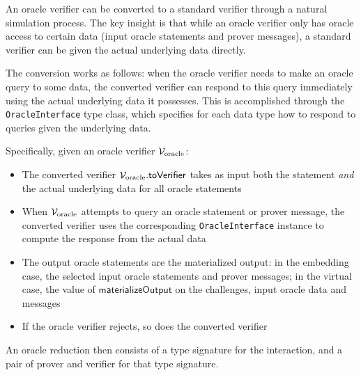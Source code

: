 \begin{definition}
    \label{def:oracle_verifier_to_verifier}
    An oracle verifier can be converted to a standard verifier through a natural simulation process. The key insight is that while an oracle verifier only has oracle access to certain data (input oracle statements and prover messages), a standard verifier can be given the actual underlying data directly.

    The conversion works as follows: when the oracle verifier needs to make an oracle query to some data, the converted verifier can respond to this query immediately using the actual underlying data it possesses. This is accomplished through the \texttt{OracleInterface} type class, which specifies for each data type how to respond to queries given the underlying data.

    Specifically, given an oracle verifier \(\mathcal{V}_{\text{oracle}}\):
    \begin{itemize}
        \item The converted verifier \(\mathcal{V}_{\text{oracle}}.\mathsf{toVerifier}\) takes as input both the statement \emph{and} the actual underlying data for all oracle statements
        \item When \(\mathcal{V}_{\text{oracle}}\) attempts to query an oracle statement or prover message, the converted verifier uses the corresponding \texttt{OracleInterface} instance to compute the response from the actual data
        \item The output oracle statements are the materialized output: in the embedding case, the selected input oracle statements and prover messages; in the virtual case, the value of \(\mathsf{materializeOutput}\) on the challenges, input oracle data and messages
        \item If the oracle verifier rejects, so does the converted verifier
    \end{itemize}
    \leanok
\end{definition}

An oracle reduction then consists of a type signature for the interaction, and a pair of prover and
verifier for that type signature.

